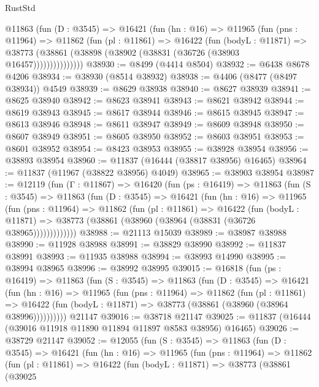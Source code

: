 \begin{lexlean}{RustStd}
\begin{coremodule}
          @11863
            (fun (D : @3545) =>
            @16421
              (fun (hn : @16) =>
              @11965
                (fun (pns : @11964) =>
                @11862
                  (fun (pl : @11861) =>
                  @16422
                    (fun (bodyL : @11871) =>
                    @38773 (@38861 (@38898 (@38902 (@38831 (@36726 (@38903 @16457)))))))))))))))
@38930 := @8499 (@4414 @8504)
@38932 := @6438 @8678 @4206
@38934 := @38930 (@8514 @38932)
@38938 := @4406 (@8477 (@8497 @38934)) @4549
@38939 := @8629 @38938
@38940 := @8627 @38939
@38941 := @8625 @38940
@38942 := @8623 @38941
@38943 := @8621 @38942
@38944 := @8619 @38943
@38945 := @8617 @38944
@38946 := @8615 @38945
@38947 := @8613 @38946
@38948 := @8611 @38947
@38949 := @8609 @38948
@38950 := @8607 @38949
@38951 := @8605 @38950
@38952 := @8603 @38951
@38953 := @8601 @38952
@38954 := @8423 @38953
@38955 := @38928 @38954
@38956 := @38893 @38954
@38960 := @11837 (@16444 (@38817 @38956) @16465)
@38964 := @11837 (@11967 (@38822 @38956) @4049)
@38965 := @38903 @38954
@38987 := @12119
    (fun (Γ : @11867) =>
    @16420
      (fun (ps : @16419) =>
      @11863
        (fun (S : @3545) =>
        @11863
          (fun (D : @3545) =>
          @16421
            (fun (hn : @16) =>
            @11965
              (fun (pns : @11964) =>
              @11862
                (fun (pl : @11861) =>
                @16422
                  (fun (bodyL : @11871) =>
                  @38773 (@38861 (@38960 (@38964 (@38831 (@36726 @38965)))))))))))))
@38988 := @21113 @15039
@38989 := @38987 @38988
@38990 := @11928 @38988
@38991 := @38829 @38990
@38992 := @11837 @38991
@38993 := @11935 @38988
@38994 := @38993 @14990
@38995 := @38994 @38965
@38996 := @38992 @38995
@39015 := @16818
    (fun (ps : @16419) =>
    @11863
      (fun (S : @3545) =>
      @11863
        (fun (D : @3545) =>
        @16421
          (fun (hn : @16) =>
          @11965
            (fun (pns : @11964) =>
            @11862
              (fun (pl : @11861) =>
              @16422 (fun (bodyL : @11871) => @38773 (@38861 (@38960 (@38964 @38996))))))))))
    @21147
@39016 := @38718 @21147
@39025 := @11837 (@16444 (@39016 @11918 @11890 @11894 @11897 @8583 @38956) @16465)
@39026 := @38729 @21147
@39052 := @12055
    (fun (S : @3545) =>
    @11863
      (fun (D : @3545) =>
      @16421
        (fun (hn : @16) =>
        @11965
          (fun (pns : @11964) =>
          @11862
            (fun (pl : @11861) =>
            @16422
              (fun (bodyL : @11871) =>
              @38773
                (@38861
                  (@39025

\end{coremodule}
\end{lexlean}
